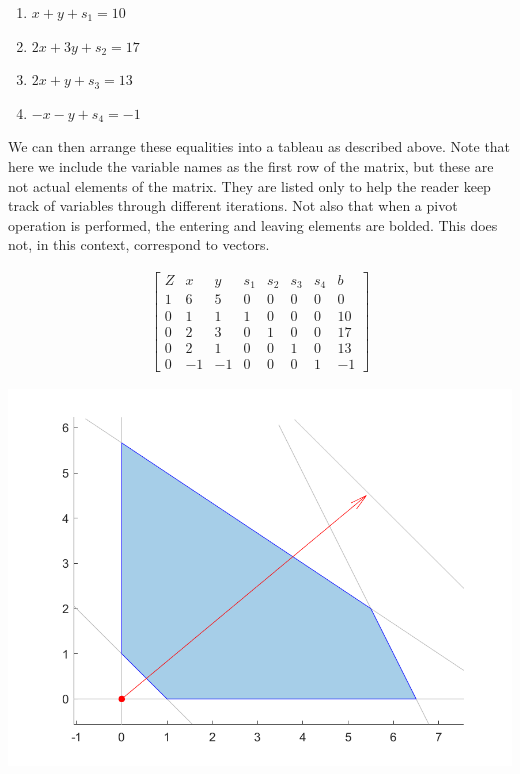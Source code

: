 \documentclass[10pt]{article}
\newenvironment{answerblock}[1]{\tcolorbox[beamer,noparskip,breakable,title={#1}]}{\endtcolorbox}
\begin{document}
\begin{answerblock}{Linear Programming Example Evaluation}
\begin{enumerate}
		\item $x + y + s_1 = 10$
		\item $2x + 3y + s_2 = 17$
		\item $2x + y + s_3 = 13$
		\item $-x-y+s_4 = -1$
	\end{enumerate}
	We can then arrange these equalities into a tableau as described above. Note that here we include the variable names as the first row of the matrix, but these are not actual elements of the matrix. They are listed only to help the reader keep track of variables through different iterations. Not also that when a pivot operation is performed, the entering and leaving elements are bolded. This does not, in this context, correspond to vectors.
	\begin{minipage}{0.6\textwidth}
		\begin{align*}
		\begin{bmatrix}
		Z	& x		& y		& s_1	& s_2	& s_3	& s_4	& b \\
		1	& 6		& 5		& 0		& 0		& 0		& 0		& 0 \\
		0	& 1		& 1		& 1		& 0		& 0		& 0		& 10 \\
		0	& 2		& 3		& 0		& 1		& 0		& 0		& 17 \\
		0	& 2		& 1		& 0		& 0		& 1		& 0		& 13 \\
		0	& -1	& -1	& 0		& 0		& 0		& 1		& -1
		\end{bmatrix}
		\end{align*}
	\end{minipage} \hfill
	\begin{minipage}{0.35\textwidth}
		\includegraphics[width = \textwidth]{images/paper_simplex_point_inv.png}
	\end{minipage}


\end{answerblock}
\end{document}
